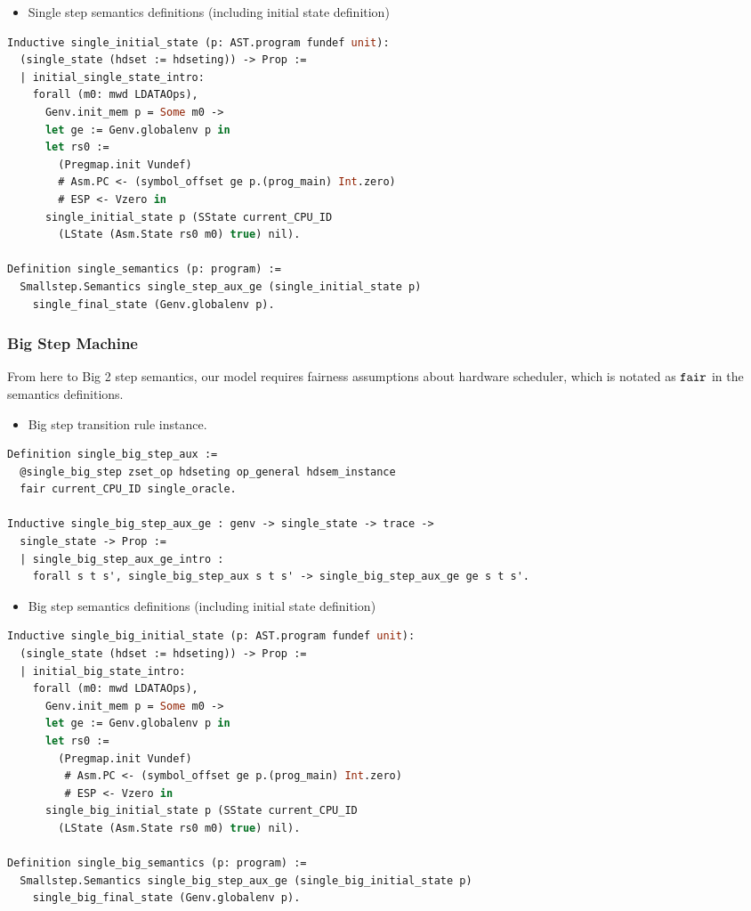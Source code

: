 \begin{itemize}[leftmargin=*]
\item Single step semantics definitions (including initial state definition)
\end{itemize}
\begin{lstlisting}[language=Caml]
Inductive single_initial_state (p: AST.program fundef unit): 
  (single_state (hdset := hdseting)) -> Prop :=
  | initial_single_state_intro: 
    forall (m0: mwd LDATAOps),
      Genv.init_mem p = Some m0 ->
      let ge := Genv.globalenv p in
      let rs0 :=
        (Pregmap.init Vundef)
        # Asm.PC <- (symbol_offset ge p.(prog_main) Int.zero)
        # ESP <- Vzero in
      single_initial_state p (SState current_CPU_ID 
        (LState (Asm.State rs0 m0) true) nil).

Definition single_semantics (p: program) :=
  Smallstep.Semantics single_step_aux_ge (single_initial_state p) 
    single_final_state (Genv.globalenv p).
\end{lstlisting}

\subsubsection{Big Step Machine}
From here to Big 2 step semantics,
our model requires fairness assumptions about hardware scheduler, which is notated as ${\mathrm{\texttt{fair}}}$ in the semantics definitions.
\begin{itemize}[leftmargin=*]
\item Big step transition rule instance.
\end{itemize}
\begin{lstlisting}[language=Caml]
Definition single_big_step_aux :=
  @single_big_step zset_op hdseting op_general hdsem_instance 
  fair current_CPU_ID single_oracle.

Inductive single_big_step_aux_ge : genv -> single_state -> trace -> 
  single_state -> Prop :=
  | single_big_step_aux_ge_intro : 
    forall s t s', single_big_step_aux s t s' -> single_big_step_aux_ge ge s t s'.
\end{lstlisting}


\begin{itemize}[leftmargin=*]
\item Big step semantics definitions (including initial state definition)
\end{itemize}
\begin{lstlisting}[language=Caml]
Inductive single_big_initial_state (p: AST.program fundef unit): 
  (single_state (hdset := hdseting)) -> Prop :=
  | initial_big_state_intro: 
    forall (m0: mwd LDATAOps),
      Genv.init_mem p = Some m0 ->
      let ge := Genv.globalenv p in
      let rs0 :=
        (Pregmap.init Vundef)
         # Asm.PC <- (symbol_offset ge p.(prog_main) Int.zero)
         # ESP <- Vzero in
      single_big_initial_state p (SState current_CPU_ID 
        (LState (Asm.State rs0 m0) true) nil).
      
Definition single_big_semantics (p: program) :=
  Smallstep.Semantics single_big_step_aux_ge (single_big_initial_state p) 
    single_big_final_state (Genv.globalenv p).
\end{lstlisting}


